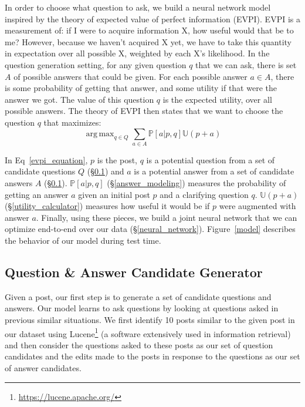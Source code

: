 \documentclass[11pt,a4paper]{article}
\DeclareMathOperator*{\argmax}{arg\,max}
\newcommand{\U}{\mathbb{U}}
\begin{document}
In order to choose what question to ask, we build a neural network model inspired by the theory of expected value of perfect information (EVPI). EVPI is a measurement of: if I were to acquire information X, how useful would that be to me? However, because we haven't acquired X yet, we have to take this quantity in expectation over all possible X, weighted by each X's likelihood. In the question generation setting, for any given question $q$ that we can ask, there is set $A$ of possible answers that could be given. For each possible answer $a \in A$, there is some probability of getting that answer, and some utility if that were the answer we got. The value of this question $q$ is the expected utility, over all possible answers. The theory of EVPI then states that we want to choose the question $q$ that maximizes:
\begin{equation}\label{evpi_equation}
\argmax_{q \in Q} \sum_{a \in A} \mathbb{P}[a | p,q] \U(p+a)
\end{equation} 

In Eq~\ref{evpi_equation}, $p$ is the post, $q$ is a potential question from a set of candidate questions $Q$ (\S\ref{question_candidate_generator}) and $a$ is a potential answer from a set of candidate answers $A$ (\S\ref{question_candidate_generator}). $\mathbb{P}[a | p,q]$ (\S\ref{answer_modeling}) measures the probability of getting an answer $a$ given an initial post $p$ and a clarifying question $q$. $\U(p+a)$ (\S\ref{utility_calculator}) measures how useful it would be if $p$ were augmented with answer $a$. Finally, using these pieces, we build a joint neural network that we can optimize end-to-end over our data (\S\ref{neural_network}). Figure~\ref{model} describes the behavior of our model during test time. 

\subsection{Question \& Answer Candidate Generator}\label{question_candidate_generator}

Given a post, our first step is to generate a set of candidate questions and answers. Our model learns to ask questions by looking at questions asked in previous similar situations. We first identify 10 posts similar to the given post in our dataset using Lucene\footnote{\url{https://lucene.apache.org/}} (a software extensively used in information retrieval) and then consider the questions asked to these posts as our set of question candidates and the edits made to the posts in response to the questions as our set of answer candidates.
\end{document}

